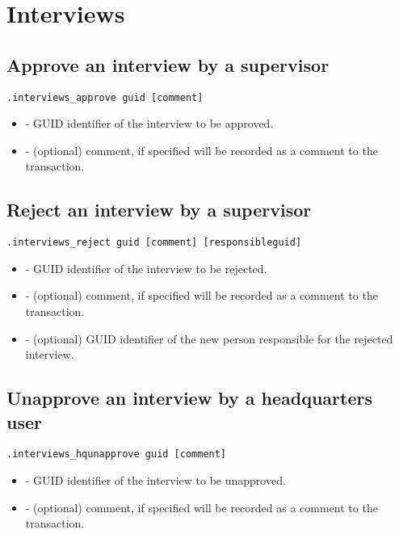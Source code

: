 \section{Interviews}

\subsection{Approve an interview by a supervisor}
\begin{lstlisting}[style=CommandLineStyle]
.interviews_approve guid [comment]
\end{lstlisting}
\paramsheader
\begin{itemize}
\item {} - GUID identifier of the interview to be approved.
\item {} - (optional) comment, if specified will be recorded as a comment to the transaction.
\end{itemize}

\subsection{Reject an interview by a supervisor}
\begin{lstlisting}[style=CommandLineStyle]
.interviews_reject guid [comment] [responsibleguid]
\end{lstlisting}
\paramsheader
\begin{itemize}
    \item {} - GUID identifier of the interview to be rejected.
    \item {} - (optional) comment, if specified will be recorded
          as a comment to the transaction.
    \item {} - (optional) GUID identifier of the new
          person responsible for the rejected interview.
\end{itemize}

\subsection{Unapprove an interview by a headquarters user}
\begin{lstlisting}[style=CommandLineStyle]
.interviews_hqunapprove guid [comment]
\end{lstlisting}
\paramsheader
\begin{itemize}
    \item {} - GUID identifier of the interview to be unapproved.
    \item {} - (optional) comment, if specified will be recorded
          as a comment to the transaction.
\end{itemize}

